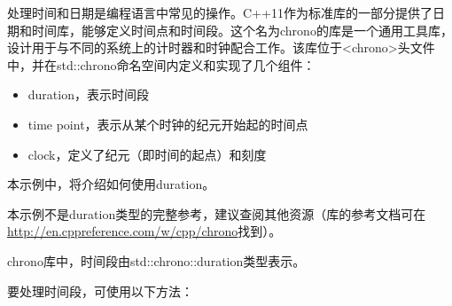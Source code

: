 处理时间和日期是编程语言中常见的操作。C++11作为标准库的一部分提供了日期和时间库，能够定义时间点和时间段。这个名为chrono的库是一个通用工具库，设计用于与不同的系统上的计时器和时钟配合工作。该库位于<chrono>头文件中，并在std::chrono命名空间内定义和实现了几个组件：

\begin{itemize}
\item
duration，表示时间段

\item
time point，表示从某个时钟的纪元开始起的时间点

\item
clock，定义了纪元（即时间的起点）和刻度
\end{itemize}

本示例中，将介绍如何使用duration。


本示例不是duration类型的完整参考，建议查阅其他资源（库的参考文档可在\url{http://en.cppreference.com/w/cpp/chrono}找到）。

chrono库中，时间段由std::chrono::duration类型表示。


要处理时间段，可使用以下方法：

